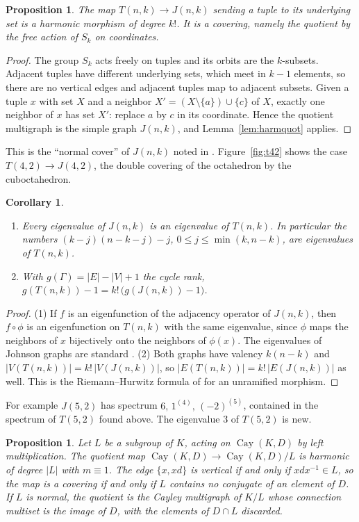 \documentclass[12pt,letterpaper]{article}
\numberwithin{equation}{section}
\newtheorem{proposition}[theorem]{Proposition}
\newtheorem{corollary}[theorem]{Corollary}
\theoremstyle{definition}
\DeclareMathOperator{\cayy}{Cay}
\begin{document}
\begin{proposition}\label{prop:cover}
The map $T(n,k)\to J(n,k)$ sending a tuple to its underlying set is a harmonic morphism of degree $k!$. It is a covering, namely the quotient by the free action of $S_k$ on coordinates.
\end{proposition}
\begin{proof}
The group $S_k$ acts freely on tuples and its orbits are the $k$-subsets. Adjacent tuples have different underlying sets, which meet in $k-1$ elements, so there are no vertical edges and adjacent tuples map to adjacent subsets. Given a tuple $x$ with set $X$ and a neighbor $X'=(X\setminus\{a\})\cup\{c\}$ of $X$, exactly one neighbor of $x$ has set $X'$: replace $a$ by $c$ in its coordinate. Hence the quotient multigraph is the simple graph $J(n,k)$, and Lemma~\ref{lem:harmquot} applies.
\end{proof}
This is the ``normal cover'' of $J(n,k)$ noted in \cite{YFZG21}. Figure~\ref{fig:t42} shows the case $T(4,2)\to J(4,2)$, the double covering of the octahedron by the cuboctahedron.
\begin{corollary}\label{cor:coverconsequences}
\begin{enumerate}
\item Every eigenvalue of $J(n,k)$ is an eigenvalue of $T(n,k)$. In particular the numbers $(k-j)(n-k-j)-j$, $0\leq j\leq\min(k,n-k)$, are eigenvalues of $T(n,k)$.
\item With $g(\Gamma)=|E|-|V|+1$ the cycle rank, $g(T(n,k))-1=k!\,\bigl(g(J(n,k))-1\bigr)$.
\end{enumerate}
\end{corollary}
\begin{proof}
(1) If $f$ is an eigenfunction of the adjacency operator of $J(n,k)$, then $f\circ\phi$ is an eigenfunction on $T(n,k)$ with the same eigenvalue, since $\phi$ maps the neighbors of $x$ bijectively onto the neighbors of $\phi(x)$. The eigenvalues of Johnson graphs are standard \cite{BCN89}. (2) Both graphs have valency $k(n-k)$ and $|V(T(n,k))|=k!\,|V(J(n,k))|$, so $|E(T(n,k))|=k!\,|E(J(n,k))|$ as well. This is the Riemann--Hurwitz formula of \cite{BN09} for an unramified morphism.
\end{proof}
For example $J(5,2)$ has spectrum $6,\,1^{(4)},\,(-2)^{(5)}$, contained in the spectrum of $T(5,2)$ found above. The eigenvalue $3$ of $T(5,2)$ is new.
\begin{proposition}\label{prop:cayleyquot}
Let $L$ be a subgroup of $K$, acting on $\cayy(K,D)$ by left multiplication. The quotient map $\cayy(K,D)\to\cayy(K,D)/L$ is harmonic of degree $|L|$ with $m\equiv1$. The edge $\{x,xd\}$ is vertical if and only if $xdx^{-1}\in L$, so the map is a covering if and only if $L$ contains no conjugate of an element of $D$. If $L$ is normal, the quotient is the Cayley multigraph of $K/L$ whose connection multiset is the image of $D$, with the elements of $D\cap L$ discarded.
\end{proposition}
\end{document}
